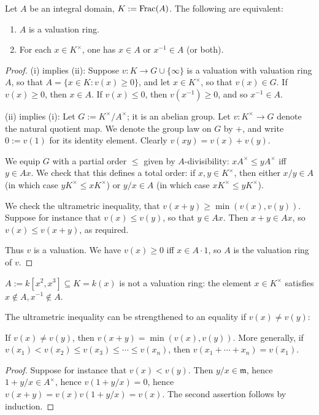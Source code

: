 \documentclass[10pt]{article}
\begin{document}
\begin{lemma}
  Let $A$ be an integral domain, $K := \operatorname{Frac}(A)$.
  The following are equivalent:
  \begin{enumerate}
  \item $A$ is a valuation ring.
  \item For each $x \in K^\times$,
    one has $x \in A$ or $x^{-1} \in A$ (or both).
  \end{enumerate}
\end{lemma}
\begin{proof}
  (i) implies (ii):
  Suppose $v : K \rightarrow G \cup \{\infty\}$ is a valuation
  with valuation ring $A$,
  so that $A = \{x \in K : v(x) \geq 0 \}$,
  and let $x \in K^\times$,
  so that $v(x) \in G$.
  If $v(x) \geq 0$, then $x \in A$.
  If $v(x) \leq 0$, then $v(x^{-1}) \geq 0$,
  and so $x^{-1} \in A$.

  (ii) implies (i):
  Let $G := K^\times / A^\times$;
  it is an abelian group.
  Let $v : K^\times \rightarrow G$
  denote the natural quotient map.
  We denote the group law on $G$ by $+$,
  and write $0 := v(1)$
  for its identity element.
  Clearly $v(x y) = v(x) + v(y)$.

  We equip $G$ with a partial order
  $\leq$ given by $A$-divisibility:
  $x A^\times  \leq y A^\times$ iff $y \in A x$.
  We check that this defines a total order:  if
  $x,y \in K^\times$, then either $x/y \in A$ (in which case
  $y K^\times \leq x K^\times$) or $y/x \in A$ (in which case
  $x K^\times \leq y K^\times$).

  We check the ultrametric inequality,
  that $v(x+y) \geq \min(v(x), v(y))$.
  Suppose for instance that $v(x) \leq v(y)$,
  so that $y \in A x$.
  Then $x + y \in A x$,
  so $v(x) \leq v(x+y)$, as required.

  Thus $v$ is a valuation.
  We have $v(x) \geq 0$ iff
  $x \in A \cdot 1$,
  so $A$ is the valuation ring of $v$.
\end{proof}

\begin{example}
  $A := k[x^2,x^3] \subseteq K = k(x)$ is not a valuation ring:
  the element $x \in K^\times$ satisfies
  $x \notin A, x^{-1} \notin A$.
\end{example}


The ultrametric inequality
can be strengthened to an equality
if \(v(x) \neq v(y)\):
\begin{lemma}
  If $v(x) \neq v(y)$,
  then $v(x+ y) = \min(v(x),v(y))$.
  More generally,
  if $v(x_1) < v(x_2) \leq v(x_3) \leq \dotsb \leq v(x_n)$,
  then $v(x_1 + \dotsb + x_n) = v(x_1)$.
\end{lemma}
\begin{proof}
  Suppose for instance that $v(x) < v(y)$.
  Then $y/x \in \mathfrak{m}$,
  hence $1 + y/x \in A^\times$,
  hence $v(1+y/x) = 0$,
  hence $v(x+y) = v(x) v(1+y/x) = v(x)$.
  The second assertion follows by induction.
\end{proof}
\end{document}
